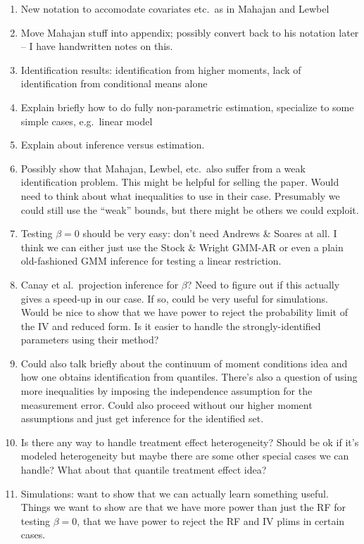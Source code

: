 \documentclass[12pt]{article}
\begin{document}
\begin{enumerate}
  \item New notation to accomodate covariates etc.\ as in Mahajan and Lewbel
  \item Move Mahajan stuff into appendix; possibly convert back to his notation later -- I have handwritten notes on this.
  \item Identification results: identification from higher moments, lack of identification from conditional means alone
  \item Explain briefly how to do fully non-parametric estimation, specialize to some simple cases, e.g.\ linear model
  \item Explain about inference versus estimation.
  \item Possibly show that Mahajan, Lewbel, etc.\ also suffer from a weak identification problem. This might be helpful for selling the paper.
    Would need to think about what inequalities to use in their case.
    Presumably we could still use the ``weak'' bounds, but there might be others we could exploit.
  \item Testing $\beta = 0$ should be very easy: don't need Andrews \& Soares at all. I think we can either just use the Stock \& Wright GMM-AR or even a plain old-fashioned GMM inference for testing a linear restriction.
  \item Canay et al.\ projection inference for $\beta$? Need to figure out if this actually gives a speed-up in our case.
    If so, could be very useful for simulations.
    Would be nice to show that we have power to reject the probability limit of the IV and reduced form.
    Is it easier to handle the strongly-identified parameters using their method?
  \item Could also talk briefly about the continuum of moment conditions idea and how one obtains identification from quantiles. There's also a question of using more inequalities by imposing the independence assumption for the measurement error.
    Could also proceed without our higher moment assumptions and just get inference for the identified set.
  \item Is there any way to handle treatment effect heterogeneity? Should be ok if it's modeled heterogeneity but maybe there are some other special cases we can handle? What about that quantile treatment effect idea?
  \item Simulations: want to show that we can actually learn something useful. Things we want to show are that we have more power than just the RF for testing $\beta=0$, that we have power to reject the RF and IV plims in certain cases.

\end{enumerate}
\end{document}
